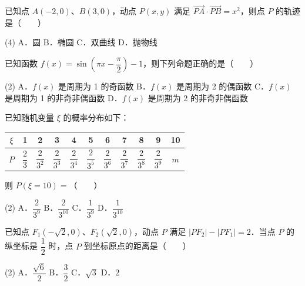 \begin{question}
已知点 $A(-2, 0)$、$B(3, 0)$，动点 $P(x, y)$ 满足 $\vec{PA} \cdot \vec{PB} = x^2$，则点 $P$ 的轨迹是\mbox{（　　）}

\begin{gkopts}(4)
\task A．圆
\task B．椭圆
\task C．双曲线
\task D．抛物线
\end{gkopts}

\end{question}
\begin{question}
已知函数 $f(x) = \sin\left(\pi x - \dfrac{\pi}{2}\right) - 1$，则下列命题正确的是\mbox{（　　）}

\begin{gkopts}(2)
\task A．$f(x)$ 是周期为 1 的奇函数
\task B．$f(x)$ 是周期为 2 的偶函数
\task C．$f(x)$ 是周期为 1 的非奇非偶函数
\task D．$f(x)$ 是周期为 2 的非奇非偶函数
\end{gkopts}

\end{question}
\begin{question}
已知随机变量 $\xi$ 的概率分布如下：

\begin{center}
\begingroup\setlength{\tabcolsep}{4pt}
\begin{tabular}{ccccccccccc}
\toprule
$\xi$ & 1 & 2 & 3 & 4 & 5 & 6 & 7 & 8 & 9 & 10 \\
\midrule
$P$ & $\dfrac{2}{3}$ & $\dfrac{2}{3^2}$ & $\dfrac{2}{3^3}$ & $\dfrac{2}{3^4}$ & $\dfrac{2}{3^5}$ & $\dfrac{2}{3^6}$ & $\dfrac{2}{3^7}$ & $\dfrac{2}{3^8}$ & $\dfrac{2}{3^9}$ & $m$ \\
\bottomrule
\end{tabular}
\endgroup
\end{center}

则 $P(\xi = 10) =$\mbox{（　　）}

\begin{gkopts}(2)
\task A．$\dfrac{2}{3^9}$
\task B．$\dfrac{2}{3^{10}}$
\task C．$\dfrac{1}{3^9}$
\task D．$\dfrac{1}{3^{10}}$
\end{gkopts}

\end{question}
\begin{question}
已知点 $F_1(-\sqrt{2}, 0)$、$F_2(\sqrt{2}, 0)$，动点 $P$ 满足 $|PF_2| - |PF_1| = 2$．当点 $P$ 的纵坐标是 $\dfrac{1}{2}$ 时，点 $P$ 到坐标原点的距离是\mbox{（　　）}

\begin{gkopts}(2)
\task A．$\dfrac{\sqrt{6}}{2}$
\task B．$\dfrac{3}{2}$
\task C．$\sqrt{3}$
\task D．$2$
\end{gkopts}

\end{question}
